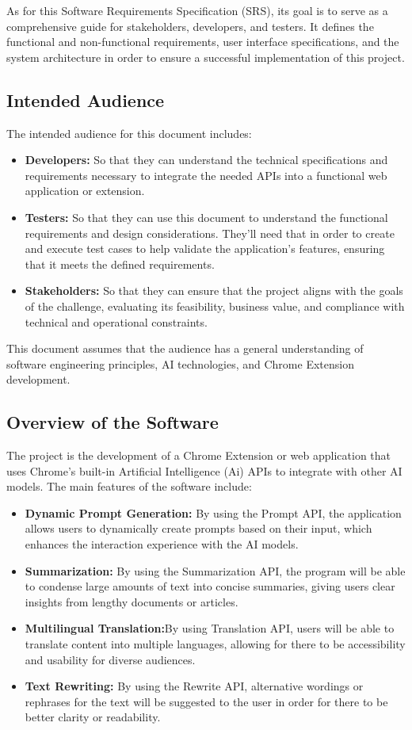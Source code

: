 \documentclass{article}
\begin{document}
As for this Software Requirements Specification (SRS), its goal is to serve as a comprehensive guide for stakeholders, developers, and testers. It defines the functional and non-functional requirements, user interface specifications, and the system architecture in order to ensure a successful implementation of this project.

\subsection{Intended Audience}
The intended audience for this document includes:
\begin{itemize}
    \item \textbf{Developers:} So that they can understand the technical specifications and requirements necessary to integrate the needed APIs into a functional web application or extension. 
    \item \textbf{Testers:} So that they can use this document to understand the functional requirements and design considerations. They'll need that in order to create and execute test cases to help validate the application’s features, ensuring that it meets the defined requirements.
    \item \textbf{Stakeholders:} So that they can ensure that the project aligns with the goals of the challenge, evaluating its feasibility, business value, and compliance with technical and operational constraints.
\end{itemize}

This document assumes that the audience has a general understanding of software engineering principles, AI technologies, and Chrome Extension development.

\subsection{Overview of the Software}
 The project is the development of a Chrome Extension or web application that uses Chrome’s built-in Artificial Intelligence (Ai) APIs to integrate with other AI models. The main features of the software include:

\begin{itemize}
    \item \textbf{Dynamic Prompt Generation:} By using the Prompt API, the application allows users to dynamically create prompts based on their input, which enhances the interaction experience with the AI models.
    \item \textbf{Summarization:} By using the Summarization API, the program will be able to condense large amounts of text into concise summaries, giving users clear insights from lengthy documents or articles.
    \item \textbf{Multilingual Translation:}By using Translation API, users will be able to translate content into multiple languages, allowing for there to be accessibility and usability for diverse audiences.
    \item \textbf{Text Rewriting:} By using the Rewrite API, alternative wordings or rephrases for the text will be suggested to the user in order for there to be better clarity or readability.
\end{itemize}
\end{document}

